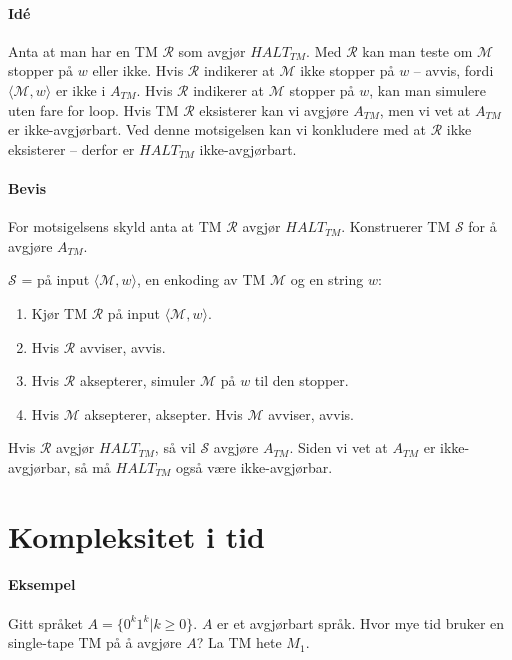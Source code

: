 \documentclass[11pt,a4paper]{article}
\begin{document}
\paragraph{Idé} Anta at man har en TM $\mathcal{R}$ som avgjør $HALT_{TM}$. Med $\mathcal{R}$ kan man teste om $\mathcal{M}$ stopper på $w$ eller ikke. Hvis $\mathcal{R}$ indikerer at $\mathcal{M}$ ikke stopper på $w$ -- avvis, fordi $\langle \mathcal{M}, w \rangle$ er ikke i $A_{TM}$. Hvis $\mathcal{R}$ indikerer at $\mathcal{M}$ stopper på $w$, kan man simulere uten fare for loop. Hvis TM $\mathcal{R}$ eksisterer kan vi avgjøre $A_{TM}$, men vi vet at $A_{TM}$ er ikke-avgjørbart. Ved denne motsigelsen kan vi konkludere med at $\mathcal{R}$ ikke eksisterer -- derfor er $HALT_{TM}$ ikke-avgjørbart.

\paragraph{Bevis} For motsigelsens skyld anta at TM $\mathcal{R}$ avgjør $HALT_{TM}$. Konstruerer TM $\mathcal{S}$ for å avgjøre $A_{TM}$.

$\mathcal{S}$ = på input $\langle \mathcal{M}, w \rangle$, en enkoding av TM $\mathcal{M}$ og en string $w$:
\begin{enumerate}
\item{Kjør TM $\mathcal{R}$ på input $\langle \mathcal{M}, w \rangle$}.
\item{Hvis $\mathcal{R}$ avviser, avvis.}
\item{Hvis $\mathcal{R}$ aksepterer, simuler $\mathcal{M}$ på $w$ til den stopper.}
\item{Hvis $\mathcal{M}$ aksepterer, aksepter. Hvis $\mathcal{M}$ avviser, avvis.}
\end{enumerate}

Hvis $\mathcal{R}$ avgjør $HALT_{TM}$, så vil $\mathcal{S}$ avgjøre $A_{TM}$. Siden vi vet at $A_{TM}$ er ikke-avgjørbar, så må $HALT_{TM}$ også være ikke-avgjørbar.


\section{Kompleksitet i tid}
\paragraph{Eksempel} Gitt språket $A = \{0^k1^k | k \geq 0\}$.
$A$ er et avgjørbart språk. Hvor mye tid bruker en single-tape TM på å avgjøre $A$? La TM hete $M_1$.
\end{document}
